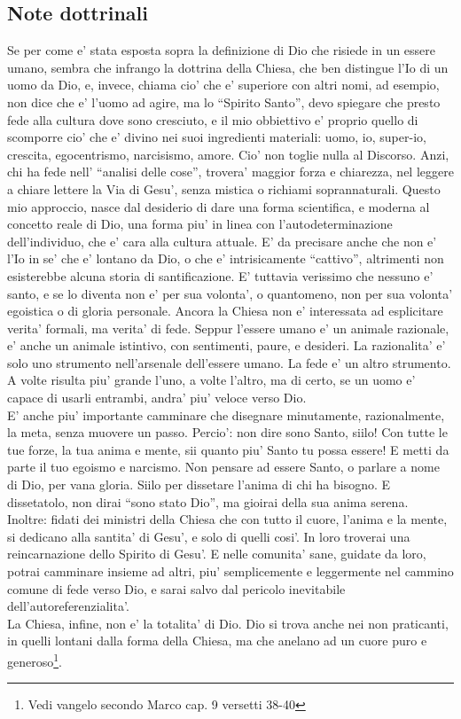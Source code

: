 \subsection{Note dottrinali}
Se per come e' stata esposta sopra la definizione di Dio che risiede in un essere umano, sembra che infrango la dottrina della Chiesa, che ben distingue l'Io di un uomo da Dio, e, invece, chiama cio' che e' superiore con altri nomi, ad esempio, non dice che e' l'uomo ad agire, ma lo ``Spirito Santo'', devo spiegare che presto fede alla cultura dove sono cresciuto, e il mio obbiettivo e' proprio quello di scomporre cio' che e' divino nei suoi ingredienti materiali: uomo, io, super-io, crescita, egocentrismo, narcisismo, amore. 
Cio' non toglie nulla al Discorso. Anzi, chi ha fede nell' ``analisi delle cose'', trovera' maggior forza e chiarezza, nel leggere a chiare lettere la Via di Gesu', senza mistica o richiami soprannaturali. Questo mio approccio, nasce dal desiderio di dare una forma scientifica, e moderna al concetto reale di Dio, una forma piu' in linea con l'autodeterminazione dell'individuo, che e' cara alla cultura attuale. E' da precisare anche che non e' l'Io in se' che e' lontano da Dio, o che e' intrisicamente ``cattivo'', altrimenti non esisterebbe alcuna storia di santificazione.
E' tuttavia verissimo che nessuno e' santo, e se lo diventa non e' per sua volonta', o quantomeno, non per sua volonta' egoistica o di gloria personale.
Ancora la Chiesa non e' interessata ad esplicitare verita' formali, ma verita' di fede. Seppur l'essere umano e' un animale razionale, e' anche un animale istintivo, con sentimenti, paure, e desideri. La razionalita' e' solo uno strumento nell'arsenale dell'essere umano. La fede e' un altro strumento. A volte risulta piu' grande l'uno, a volte l'altro, ma di certo, se un uomo e' capace di usarli entrambi, andra' piu' veloce verso Dio.\\
E' anche piu' importante camminare che disegnare minutamente, razionalmente, la meta, senza muovere un passo.  Percio': non dire sono Santo, siilo!  Con tutte le tue forze, la tua anima e mente, sii quanto piu' Santo tu possa essere! E metti da parte il tuo egoismo e narcismo.  Non pensare ad essere Santo, o parlare a nome di Dio, per vana gloria. Siilo per dissetare l'anima di chi ha bisogno. E dissetatolo, non dirai ``sono stato Dio'', ma gioirai della sua anima serena.\\
Inoltre: fidati dei ministri della Chiesa che con tutto il cuore, l'anima e la mente, si dedicano alla santita' di Gesu', e solo di quelli cosi'. In loro troverai una reincarnazione dello Spirito di Gesu'. E nelle comunita' sane, guidate da loro, potrai camminare insieme ad altri, piu' semplicemente e leggermente nel cammino comune di fede verso Dio, e sarai salvo dal pericolo inevitabile dell'autoreferenzialita'.\\
La Chiesa, infine, non e' la totalita' di Dio. Dio si trova anche nei non praticanti, in quelli lontani dalla forma della Chiesa, ma che anelano ad un cuore puro e generoso\footnote{Vedi vangelo secondo Marco cap. 9 versetti 38-40}.

